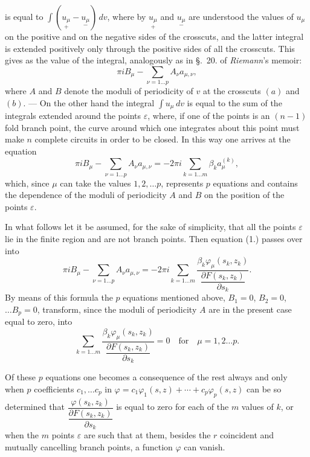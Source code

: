 \documentclass{article}
\begin{document}
is equal to $\displaystyle\int (\underset{+}{u_{\mu}} - \underset{-}{u_{\mu}})\,dv$, where by $\underset{+}{u_{\mu}}$ and $\underset{-}{u_{\mu}}$ are understood the values of $u_{\mu}$ on the positive and on the negative sides of the crosscuts, and the latter integral is extended positively only through the positive sides of all the crosscuts. This gives as the value of the integral, analogously as in §.~20. of \emph{Riemann}'s memoir:
\[ \pi i B_{\mu} - \sum_{\nu=1\ldots p} A_{\nu} a_{\mu, \nu}, \]
where $A$ and $B$ denote the moduli of periodicity of $v$ at the crosscuts $(a)$ and $(b)$. --- On the other hand the integral $\displaystyle\int u_{\mu}\,dv$ is equal to the sum of the integrals extended around the points $\varepsilon$, where, if one of the points is an $(n-1)$fold branch point, the curve around which one integrates about this point must make $n$ complete circuits in order to be closed. In this way one arrives at the equation
\[ \pi i B_{\mu} - \sum_{\nu=1\ldots p} A_{\nu} a_{\mu, \nu} = -2\pi i \sum_{k=1\ldots m} \beta_{k} a_{\mu}^{(k)}, \tag{1.} \]
which, since $\mu$ can take the values $1, 2, \ldots p$, represents $p$ equations and contains the dependence of the moduli of periodicity $A$ and $B$ on the position of the points $\varepsilon$.

In what follows let it be assumed, for the sake of simplicity, that all the points $\varepsilon$ lie in the finite region and are not branch points. Then equation (1.) passes over into
\[ \pi i B_{\mu} - \sum_{\nu=1\ldots p} A_{\nu} a_{\mu, \nu} = -2\pi i \sum_{k=1\ldots m} \frac{\beta_{k} \varphi_{\mu}(s_{k}, z_{k})}{\dfrac{\partial F(s_{k}, z_{k})}{\partial s_{k}}}. \tag{2.} \]
By means of this formula the $p$ equations mentioned above, $B_{1} = 0$, $B_{2} = 0$, $\ldots B_{p} = 0$, transform, since the moduli of periodicity $A$ are in the present case equal to zero, into
\[ \sum_{k=1\ldots m} \frac{\beta_{k} \varphi_{\mu}(s_{k}, z_{k})}{\dfrac{\partial F(s_{k}, z_{k})}{\partial s_{k}}} = 0 \quad \text{for} \quad \mu = 1, 2 \ldots p. \]

Of these $p$ equations one becomes a consequence of the rest always and only when $p$ coefficients $c_{1}, \ldots c_{p}$ in $\varphi = c_{1} \varphi_{1}(s, z) + \cdots + c_{p} \varphi_{p}(s, z)$ can be so determined that $\dfrac{\varphi(s_{k}, z_{k})}{\dfrac{\partial F(s_{k}, z_{k})}{\partial s_{k}}}$ is equal to zero for each of the $m$ values of $k$, or when the $m$ points $\varepsilon$ are such that at them, besides the $r$ coincident and mutually cancelling branch points, a function $\varphi$ can vanish.
\end{document}
